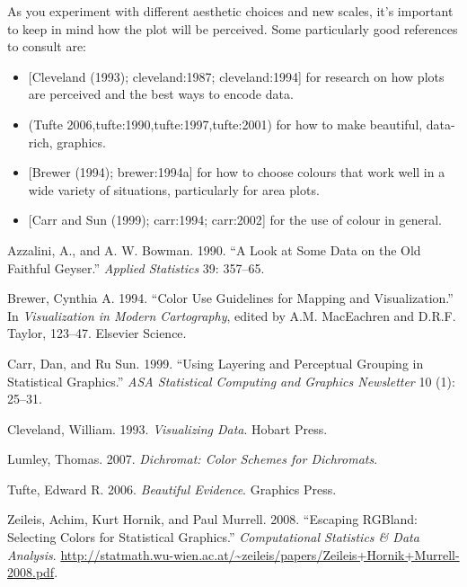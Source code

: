 
As you experiment with different aesthetic choices and new scales, it's
important to keep in mind how the plot will be perceived. Some
particularly good references to consult are:

\begin{itemize}
\itemsep1pt\parskip0pt
\item
  {[}Cleveland (1993); cleveland:1987; cleveland:1994{]} for research on
  how plots are perceived and the best ways to encode data.
\item
  (Tufte 2006,tufte:1990,tufte:1997,tufte:2001) for how to make
  beautiful, data-rich, graphics.
\item
  {[}Brewer (1994); brewer:1994a{]} for how to choose colours that work
  well in a wide variety of situations, particularly for area plots.
\item
  {[}Carr and Sun (1999); carr:1994; carr:2002{]} for the use of colour
  in general.
\end{itemize}

Azzalini, A., and A. W. Bowman. 1990. ``A Look at Some Data on the Old
Faithful Geyser.'' \emph{Applied Statistics} 39: 357--65.

Brewer, Cynthia A. 1994. ``Color Use Guidelines for Mapping and
Visualization.'' In \emph{Visualization in Modern Cartography}, edited
by A.M. MacEachren and D.R.F. Taylor, 123--47. Elsevier Science.

Carr, Dan, and Ru Sun. 1999. ``Using Layering and Perceptual Grouping in
Statistical Graphics.'' \emph{ASA Statistical Computing and Graphics
Newsletter} 10 (1): 25--31.

Cleveland, William. 1993. \emph{Visualizing Data}. Hobart Press.

Lumley, Thomas. 2007. \emph{Dichromat: Color Schemes for Dichromats}.

Tufte, Edward R. 2006. \emph{Beautiful Evidence}. Graphics Press.

Zeileis, Achim, Kurt Hornik, and Paul Murrell. 2008. ``Escaping RGBland:
Selecting Colors for Statistical Graphics.'' \emph{Computational
Statistics \& Data Analysis}.
\url{http://statmath.wu-wien.ac.at/~zeileis/papers/Zeileis+Hornik+Murrell-2008.pdf}.
